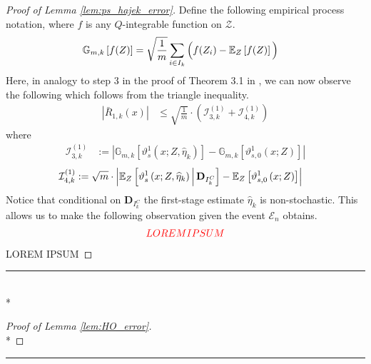 \begin{proof}[Proof of Lemma \ref{lem:ps_hajek_error}]
    Define the following empirical process notation, where $f$ is any $Q$-integrable function on $\mathcal{Z}$.
    \begin{equation}
        \begin{aligned}
            \mathbb{G}_{m,k}\left[f(Z)\right]
            & = \sqrt{\frac{1}{m}} \sum_{i \in I_{k}} \Big(f(Z_i) - \mathbb{E}_{Z}\left[f(Z)\right]\Big)
        \end{aligned}
    \end{equation}
    Here, in analogy to step 3 in the proof of Theorem 3.1 in \citet{chernozhukov_doubledebiased_2018}, we can now observe the following which follows from the triangle inequality.
    \begin{equation}
        \begin{aligned}
            \left|\bar{R}_{1, k}\left(x\right)\right|
            & \leq \sqrt{\frac{1}{m}} \cdot \left(\mathcal{I}_{3,k}^{(1)} + \mathcal{I}_{4,k}^{(1)}\right)
        \end{aligned}
    \end{equation}
    where
    \begin{equation}
        \begin{aligned}
            \mathcal{I}_{3,k}^{(1)} 
            & := \left|\mathbb{G}_{m,k}\left[\vartheta_{s}^{1}\left(x; Z, \hat{\eta}_{k}\right)\right] 
            - \mathbb{G}_{m,k}\left[\vartheta_{s,0}^{1}\left(x; Z\right) \right]\right|
        \end{aligned}
    \end{equation}
    \begin{equation}
        \begin{aligned}
            \mathcal{I}_{4,k}^{(1)} 
            & := \sqrt{m} \cdot \left|
            \mathbb{E}_{Z}\left[\vartheta_{s}^{1}\left(x; Z, \widehat{\eta}_{k}\right) \, \middle| \, \mathbf{D}_{I_{k}^{C}}\right]
            - \mathbb{E}_{Z}\left[\vartheta_{s,0}^{1}\left(x; Z\right) \right]\right|
        \end{aligned}
    \end{equation}
    Notice that conditional on $\mathbf{D}_{I_{k}^{C}}$ the first-stage estimate $\hat{\eta}_{k}$ is non-stochastic.
    This allows us to make the following observation given the event $\mathcal{E}_{n}$ obtains.
    \begin{equation}
        \begin{aligned}
            {\color{red} LOREM IPSUM}
        \end{aligned}
    \end{equation}
{\color{red} LOREM IPSUM}
\end{proof}

\hrule

\begin{lem}\label{lem:HO_error}\mbox{}\\*
    
\end{lem}

\begin{proof}[Proof of Lemma \ref{lem:HO_error}]\mbox{}\\*
    
\end{proof}

\hrule
